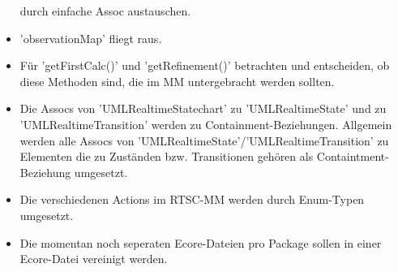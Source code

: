 \documentclass[11pt,a4paper]{article}
\begin{document}
\begin{itemize}
durch einfache Assoc austauschen.
\item  'observationMap' fliegt raus.
\item  Für 'getFirstCalc()' und 'getRefinement()' betrachten und entscheiden,
ob diese Methoden sind, die im MM untergebracht werden sollten.
\item  Die Assocs von 'UMLRealtimeStatechart' zu 'UMLRealtimeState' und zu
'UMLRealtimeTransition' werden zu Containment-Beziehungen. Allgemein
werden alle Assocs von 'UMLRealtimeState'/'UMLRealtimeTransition' zu
Elementen die zu Zuständen bzw. Transitionen gehören als
Containtment-Beziehung umgesetzt.
\item  Die verschiedenen Actions im RTSC-MM werden durch Enum-Typen umgesetzt.
\item  Die momentan noch seperaten Ecore-Dateien pro Package sollen in einer
Ecore-Datei vereinigt werden.


\end{itemize}
\end{document}
